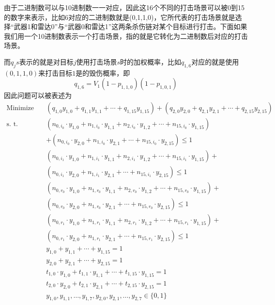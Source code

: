 由于二进制数可以与10进制数一一对应，因此这16个不同的打击场景可以被0到15的数字来表示，比如6对应的二进制数就是(0,1,1,0)，它所代表的打击场景就是选择“武器1和雷达0”与“武器0和雷达1”这两条杀伤链对某个目标进行打击。下面如果我们用一个10进制数表示一个打击场景，指的就是它转化为二进制数后对应的打击场景。

而$q_js$表示的就是对目标$j$使用打击场景$s$时的加权概率，比如$q_{1,6}$对应的就是使用$(0, 1, 1, 0)$来打击目标$1$是的毁伤概率，即
\begin{equation*}
    q_{1, 6} = V_1(1 - p_{1, 1, 0}) (1 - p_{1,0,1})
\end{equation*}
因此问题可以被表述为
\begin{align}
    \text{Minimize} \quad & (q_{1,0}y_{1,0} + q_{1,1}y_{1,1} + \cdots + q_{1,15}y_{1,15}) + (q_{2,0}y_{2,0} + q_{2,1}y_{2,1} + \cdots + q_{2,15}y_{2,15}) \\
    \text{s. t.} \quad & (n_{0, i_0} \cdot y_{1,0} + n_{1, i_0} \cdot y_{1,1} + n_{2, i_0} \cdot y_{1,2} + \cdots + n_{15, i_0} \cdot y_{1,15}) \\
    & + (n_{0, i_0} \cdot y_{2,0} + n_{1, i_0} \cdot y_{2,1} + \cdots + n_{15, i_0} \cdot y_{2,15}) \leq 1 \\
    & (n_{0, i_1} \cdot y_{1,0} + n_{1, i_1} \cdot y_{1,1} + n_{2, i_1} \cdot y_{1,2} + \cdots + n_{15, i_1} \cdot y_{1,15})+ \\
    & (n_{0, i_1} \cdot y_{2,0} + n_{1, i_1} \cdot y_{2,1} + \cdots + n_{15, i_1} \cdot y_{2,15}) \leq 1 \\
    & (n_{0, r_0} \cdot y_{1,0} + n_{1, r_0} \cdot y_{1,1} + n_{2, r_0} \cdot y_{1,2} + \cdots + n_{15, r_0} \cdot y_{1,15})+ \\
    & (n_{0, r_0} \cdot y_{2,0} + n_{1, r_0} \cdot y_{2,1} + \cdots + n_{15, r_0} \cdot y_{2,15}) \leq 1 \\
    & (n_{0, r_1} \cdot y_{1,0} + n_{1, r_1} \cdot y_{1,1} + n_{2, r_1} \cdot y_{1,2} + \cdots + n_{15, r_1} \cdot y_{1,15})+ \\
    & (n_{0, r_1} \cdot y_{2,0} + n_{1, r_1} \cdot y_{2,1} + \cdots + n_{15, r_1} \cdot y_{2,15}) \leq 1 \\
    & y_{1,0} + y_{1,1} + \cdots + y_{1,15} = 1 \\
    & y_{2,0} + y_{2,1} + \cdots + y_{2,15} = 1 \\
    & t_{1,0} \cdot y_{1,0} + t_{1,1} \cdot y_{1,1} + \cdots + t_{1,15} \cdot y_{1,15} = 1 \\
    & t_{2,0} \cdot y_{2,0} + t_{2,1} \cdot y_{2,1} + \cdots + t_{2,15} \cdot y_{2,15} = 1 \\
    & y_{1,0}, y_{1,1}, \ldots, y_{1,7}, y_{2,0}, y_{2,1}, \ldots, y_{2,7} \in \{0, 1\}
\end{align}



